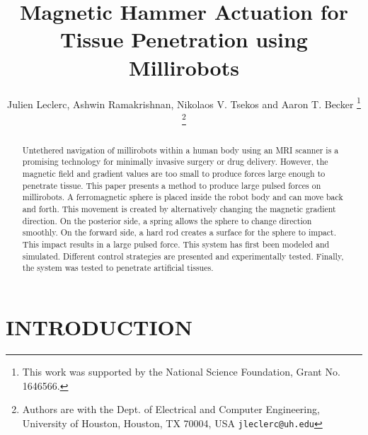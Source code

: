 \documentclass[letterpaper, 10 pt, conference]{ieeeconf}  %
\title{\LARGE \bf
Magnetic Hammer Actuation for Tissue Penetration using Millirobots
}
\author{Julien Leclerc, Ashwin Ramakrishnan, Nikolaos V. Tsekos and Aaron T. Becker %
\thanks{This work was supported by the National Science Foundation, Grant No. 1646566. }%
\thanks{Authors are with the Dept. of Electrical and Computer
Engineering, University of Houston, Houston, TX 70004, USA
        {\tt\small jleclerc@uh.edu}}%
}
\begin{document}
\maketitle
\thispagestyle{empty}
\pagestyle{empty}


\begin{abstract}

Untethered navigation of millirobots within a human body using an MRI scanner is a promising technology for minimally invasive surgery or drug delivery. However, the magnetic field and gradient values are too small to produce forces large enough to penetrate tissue. This paper presents a method to produce large pulsed forces on millirobots. A ferromagnetic sphere is placed inside the robot body and can move back and forth. This movement is created by alternatively changing the magnetic gradient direction. On the posterior side, a spring allows the sphere to change direction smoothly. On the forward side, a hard rod creates a surface for the sphere to impact. This impact results in a large pulsed force. This system has first been modeled and simulated. Different control strategies are presented and experimentally tested. Finally, the system was tested to penetrate artificial tissues. 

\end{abstract}


\section{INTRODUCTION}
\end{document}
